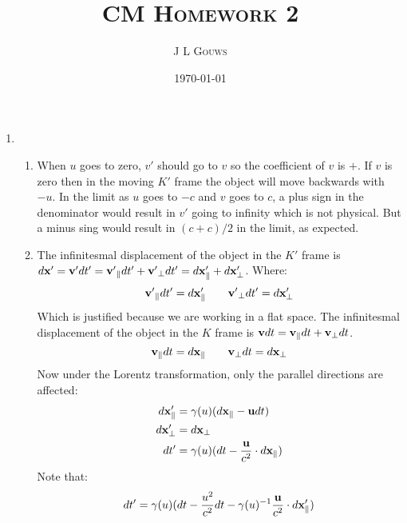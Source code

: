 \documentclass[12pt,a4]{article}
\title{
\textsc{CM Homework 2}
}
\author{\textsc{J L Gouws}
}
\date{\today
\\[1cm]}
\begin{document}
\thispagestyle{empty}

\maketitle

\begin{enumerate}
  \item
    \begin{enumerate}
      \item 
        When $u$ goes to zero, $v'$ should go to $v$ so the coefficient of $v$ is $+$.
        If $v$ is zero then in the moving $K'$ frame the object will move backwards with $-u$.
        In the limit as $u$ goes to $-c$ and $v$ goes to $c$, a plus sign in the denominator would result in $v'$ going to infinity which is not physical.
        But a minus sing would result in $(c + c) / 2$ in the limit, as expected.
      \item
        The infinitesmal displacement of the object in the $K'$ frame is $d{\bf x'} = {\bf v'}dt' = {\bf v'}_{\parallel} dt' + {\bf v'}_{\perp}dt' = d {\bf x}'_\parallel + d {\bf x}'_\perp$. Where:
        \begin{equation*}
          {\bf v'}_{\parallel} dt' = d {\bf x}'_\parallel \qquad {\bf v'}_{\perp}dt' = d {\bf x}'_\perp
        \end{equation*}
        Which is justified because we are working in a flat space.
        The infinitesmal displacement of the object in the $K$ frame is ${\bf v}dt = {\bf v}_{\parallel} dt + {\bf v}_{\perp}dt$.
        \begin{equation*}
          {\bf v}_{\parallel} dt = d {\bf x}_\parallel \qquad {\bf v}_{\perp}dt = d {\bf x}_\perp
        \end{equation*}
        Now under the Lorentz transformation, only the parallel directions are affected:
        \begin{align}
          d {\bf x}'_\parallel &= \gamma (u) (d {\bf x}_\parallel - {\bf u} dt) \label{eq:x1}\\
          d {\bf x}'_\perp &= d {\bf x}_\perp \label{eq:x2}\\
          d t' &= \gamma (u) (d t - \frac{{\bf u}}{c^2} \cdot d{\bf x}_\parallel)   \label{eq:x3}
        \end{align}
        Note that:
        \begin{align}
          d t' &= \gamma(u) (dt - \frac{u^2}{c^2} dt - \gamma(u)^{-1}\frac{{\bf u}}{c^2} \cdot d {\bf x}'_\parallel) \nonumber\\

\end{align}
\end{enumerate}
\end{enumerate}
\end{document}
